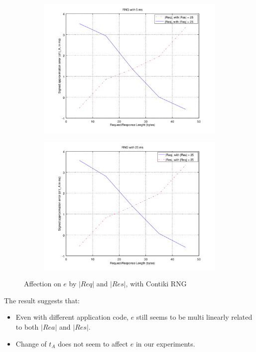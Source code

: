 \begin{figure}[ht!]
	\center
	\begin{subfigure}{0.45\linewidth}
		\center
		\includegraphics[width=\linewidth]{fig/errwithlen5ms.png}
	\end{subfigure}
	\begin{subfigure}{0.45\linewidth}
		\center
		\includegraphics[width=\linewidth]{fig/errwithlen25ms.png}
	\end{subfigure}
	\caption{Affection on $e$ by $|Req|$ and $|Res|$, with Contiki RNG}
	\label{Fig: e by len}
\end{figure}

The result suggests that:
\begin{itemize}
	\item Even with different application code, $e$ still seems to be multi linearly related to both $|Rea|$ and $|Res|$.
	\item Change of $t_A$ does not seem to affect $e$ in our experiments.
\end{itemize}

